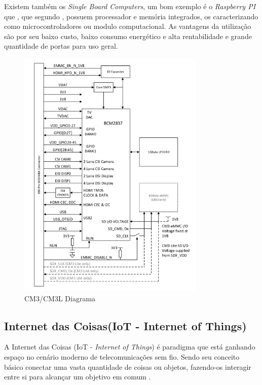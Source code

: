 Existem também os \textit{Single Board Computers}, um bom exemplo é o \textit{Raspberry PI} que , que segundo , possuem processador e memória integrados, os caracterizando como microcontroladores ou modulo computacional. As vantagens da utilização são por seu baixo custo, baixo consumo energético e alta rentabilidade e grande quantidade de portas para uso geral.
 \begin{figure}[H]
	\centering
    	\caption{\label{fig:raspsheet} CM3/CM3L Diagrama }
		\includegraphics[width = 0.8\textwidth]	{resources/raspsheet}
\end{figure}


\subsection{Internet das Coisas(IoT - Internet of Things)}
A Internet das Coisas (IoT - \textit{Internet of Things}) é paradigma que está ganhando espaço no cenário moderno de telecomunicações sem fio. Sendo seu conceito básico conectar uma vasta quantidade de coisas ou objetos, fazendo-os interagir entre si para alcançar um objetivo em comum \cite{atzori2010internet}.

